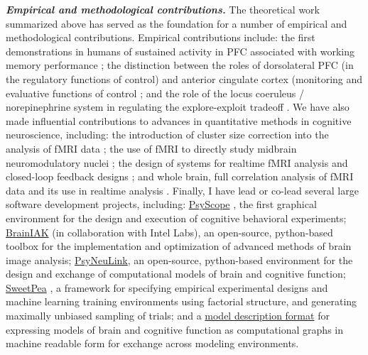 \documentclass[10 pt]{article}
\begin{document}
\textit{\textbf{Empirical and methodological contributions.}} The theoretical work summarized above has served as the foundation for a number of empirical and methodological contributions. Empirical contributions include: the first demonstrations in humans of sustained activity in PFC associated with working memory performance \cite{cohen1994activation}\cite{cohen1997temporal}; the distinction between the roles of dorsolateral PFC (in the regulatory functions of control) and anterior cingulate cortex (monitoring and evaluative functions of control \cite{carter1998anterior}\cite{botvinick1999conflict}\cite{macdonald2000dissociating}\cite{kerns2004anterior}; and the role of the locus coeruleus / norepinephrine system in regulating the explore-exploit tradeoff \cite{gilzenrat2010pupil}\cite{kane2017increased}. We have also made influential contributions to advances in quantitative methods in cognitive neuroscience, including: the introduction of cluster size correction into the analysis of fMRI data \cite{casey1998reproducibility}; the use of fMRI to directly study midbrain neuromodulatory nuclei \cite{dardenne2008bold}; the design of systems for realtime fMRI analysis \cite{forman1995improved}\cite{wallace2022rtcloud} and closed-loop feedback designs \cite{debettencourt2015closed}\cite{mennen2021cloudbased}; and whole brain, full correlation analysis of fMRI data and its use in realtime analysis \cite{wang2015full}. Finally, I have lead or co-lead several large software development projects, including: \href{https://en.wikipedia.org/wiki/PsyScope}{PsyScope} \cite{cohen1993psyscope}, the first graphical environment for the design and execution of cognitive behavioral experiments; \href{http://BrainIAK.org}{BrainIAK} \cite{kumar2021brainiak}\cite{wallace2022rtcloud} (in collaboration with Intel Labs), an open-source, python-based toolbox for the implementation and optimization of advanced methods of brain image analysis; \href{https://psyneuln.deptcpanel.princeton.edu/}{PsyNeuLink}, an open-source, python-based environment for the design and exchange of computational models of brain and cognitive function; \href{https://sites.google.com/view/sweetpea-ai/}{SweetPea} \cite{musslick2022sweetpea}, a framework for specifying empirical experimental designs and machine learning training environments using factorial structure, and generating maximally unbiased sampling of trials; and a \href{https://modeci.github.io/Website/}{model description format} \cite{gleeson2023integrating} for expressing models of brain and cognitive function as computational graphs in machine readable form for exchange across modeling environments.
\end{document}
